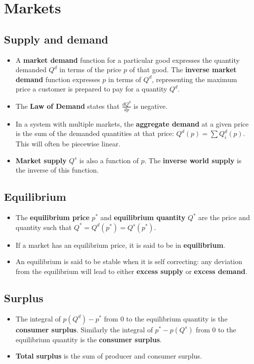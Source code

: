 \documentclass[a4paper]{article}
\begin{document}
 

\tableofcontents

\newpage

\section{Markets}
\subsection{Supply and demand}
\begin{itemize}
    \item A \textbf{market demand} function for a particular good expresses the quantity demanded $Q^d$ in terms of the price $p$ of that good. The \textbf{inverse market demand} function expresses $p$ in terms of $Q^d$, representing the maximum price a customer is prepared to pay for a quantity $Q^d$.
    \item The \textbf{Law of Demand} states that $\frac{dQ^d}{dp}$ is negative.  
    \item In a system with multiple markets, the \textbf{aggregate demand} at a given price is the sum of the demanded quantities at that price: $Q^d(p) = \sum Q^d_i(p)$. This will often be piecewise linear.
    \item \textbf{Market supply} $Q^s$ is also a function of $p$. The \textbf{inverse world supply} is the inverse of this function. 
\end{itemize}

\subsection{Equilibrium}
\begin{itemize}
    \item The \textbf{equilibrium price} $p^*$ and \textbf{equilibrium quantity} $Q^*$ are the price and quantity such that $Q^* = Q^d(p^*) = Q^s(p^*)$. 
    \item If a market has an equilibrium price, it is said to be in \textbf{equilibrium}.
    \item An equilibrium is said to be stable when it is self correcting: any deviation from the equilibrium will lead to either \textbf{excess supply} or \textbf{excess demand}. 
\end{itemize}

\subsection{Surplus}
\begin{itemize}
    \item The integral of $p(Q^d) - p^*$ from $0$ to the equilibrium quantity is the \textbf{consumer surplus}. Similarly the integral of $p^* - p(Q^s)$ from $0$ to the equilibrium quantity is the \textbf{consumer surplus}.  
    \item \textbf{Total surplus} is the sum of producer and consumer surplus. 
\end{itemize}
\end{document}
